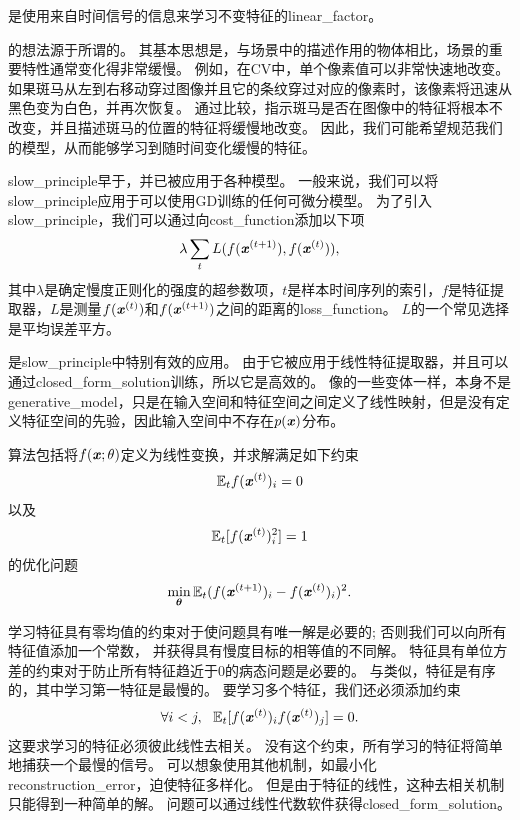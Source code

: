 是使用来自时间信号的信息来学习不变特征的\gls{linear_factor}\citep{WisSej2002}。


的想法源于所谓的。
其基本思想是，与场景中的描述作用的物体相比，场景的重要特性通常变化得非常缓慢。
例如，在\gls{CV}中，单个像素值可以非常快速地改变。
如果斑马从左到右移动穿过图像并且它的条纹穿过对应的像素时，该像素将迅速从黑色变为白色，并再次恢复。
通过比较，指示斑马是否在图像中的特征将根本不改变，并且描述斑马的位置的特征将缓慢地改变。
因此，我们可能希望规范我们的模型，从而能够学习到随时间变化缓慢的特征。


\gls{slow_principle}早于，并已被应用于各种模型\citep{Hinton89b,Foldiak89,MobahiCollobertWestonICML2009,Bergstra+Bengio-2009}。
一般来说，我们可以将\gls{slow_principle}应用于可以使用\gls{GD}训练的任何可微分模型。 
为了引入\gls{slow_principle}，我们可以通过向\gls{cost_function}添加以下项
\begin{align}
\label{eqn:137}
\lambda \sum_t L(f(\boldsymbol{\mathit{x}}^{(t+1)}),f(\boldsymbol{\mathit{x}}^{(t)})),
\end{align}
其中$\lambda$是确定慢度正则化的强度的超参数项，$t$是样本时间序列的索引，$f$是特征提取器，$L$是测量$f(\boldsymbol{\mathit{x}}^{(t)})$和$f(\boldsymbol{\mathit{x}}^{(t+1)})$之间的距离的\gls{loss_function}。
$L$的一个常见选择是平均误差平方。


是\gls{slow_principle}中特别有效的应用。
由于它被应用于线性特征提取器，并且可以通过\gls{closed_form_solution}训练，所以它是高效的。
像的一些变体一样，本身不是\gls{generative_model}，只是在输入空间和特征空间之间定义了线性映射，但是没有定义特征空间的先验，因此输入空间中不存在$p(\boldsymbol{\mathit{x}})$分布。


算法\citep{WisSej2002}包括将$f(\boldsymbol{\mathit{x}};\theta)$定义为线性变换，并求解满足如下约束
\begin{align}
\label{eqn:139}
\mathbb{E}_t  f(\boldsymbol{\mathit{x}}^{(t)})_i = 0 
\end{align}
以及
\begin{align}
\label{eqn:1310}
\mathbb{E}_t [ f(\boldsymbol{\mathit{x}}^{(t)})_i^2 ] =1 
\end{align}
的优化问题
\begin{align}
\label{eqn:138}
\min_{\boldsymbol{\theta}} \mathbb{E}_t  (f(\boldsymbol{\mathit{x}}^{(t+1)})_i - f(\boldsymbol{\mathit{x}}^{(t)})_i  )^2.
\end{align}


学习特征具有零均值的约束对于使问题具有唯一解是必要的; 否则我们可以向所有特征值添加一个常数，
并获得具有慢度目标的相等值的不同解。
特征具有单位方差的约束对于防止所有特征趋近于$0$的病态问题是必要的。
与类似，特征是有序的，其中学习第一特征是最慢的。
要学习多个特征，我们还必须添加约束
\begin{align}
\label{eqn:1311}
\forall i<j,\ \  \mathbb{E}_t [f(\boldsymbol{\mathit{x}}^{(t)})_i  f(\boldsymbol{\mathit{x}}^{(t)})_j] = 0.
\end{align}
这要求学习的特征必须彼此线性去相关。 
没有这个约束，所有学习的特征将简单地捕获一个最慢的信号。
可以想象使用其他机制，如最小化\gls{reconstruction_error}，迫使特征多样化。
但是由于特征的线性，这种去相关机制只能得到一种简单的解。 
问题可以通过线性代数软件获得\gls{closed_form_solution}。



